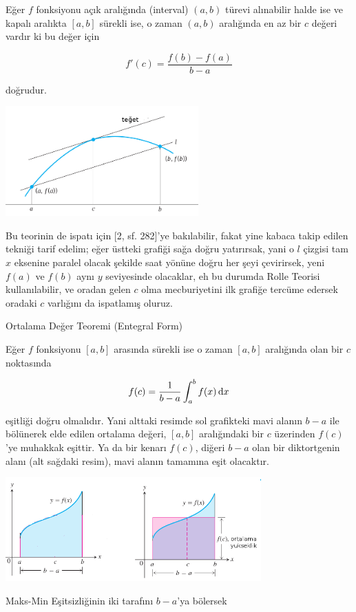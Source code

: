 \documentclass[12pt,fleqn]{article}\usepackage{../../common}
\begin{document}
Eğer $f$ fonksiyonu açık aralığında (interval) $(a,b)$ türevi alınabilir halde
ise ve kapalı aralıkta $[a,b]$ sürekli ise, o zaman $(a,b)$ aralığında
en az bir $c$ değeri vardır ki bu değer için

$$
f'(c) = \frac{f(b) - f(a)}{b-a}
$$

doğrudur.

\includegraphics[width=20em]{calc_multi_app_01.png}

Bu teorinin de ispatı için [2, sf. 282]'ye bakılabilir, fakat yine kabaca takip
edilen tekniği tarif edelim; eğer üstteki grafiği sağa doğru yatırırsak, yani o
$l$ çizgisi tam $x$ eksenine paralel olacak şekilde saat yönüne doğru her şeyi
çevirirsek, yeni $f(a)$ ve $f(b)$ aynı $y$ seviyesinde olacaklar, eh bu durumda
Rolle Teorisi kullanılabilir, ve oradan gelen $c$ olma mecburiyetini ilk grafiğe
tercüme edersek oradaki $c$ varlığını da ispatlamış oluruz.

Ortalama Değer Teoremi (Entegral Form)

Eğer $f$ fonksiyonu $[a,b]$ arasında sürekli ise o zaman $[a,b]$ aralığında
olan bir $c$ noktasında

$$ f(c) = \frac{1}{b-a}\int_a^b f(x) \,\mathrm{d} x $$

eşitliği doğru olmalıdır. Yani alttaki resimde sol grafikteki mavi alanın
$b-a$ ile bölünerek elde edilen ortalama değeri, $[a,b]$ aralığındaki bir
$c$ üzerinden $f(c)$'ye muhakkak eşittir. Ya da bir kenarı $f(c)$, diğeri
$b-a$ olan bir diktortgenin alanı (alt sağdaki resim), mavi alanın
tamamına eşit olacaktır.

\includegraphics[height=4cm]{calc_multi_app_07.png}

Maks-Min Eşitsizliğinin iki tarafını $b-a$'ya bölersek
\end{document}

